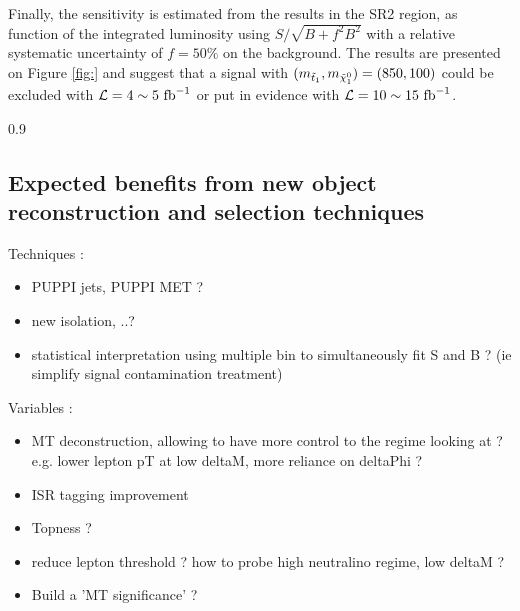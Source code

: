         \begin{table}
            \centering
             
            \caption{ \label{tab:phys14SignalRegions}}
        \end{table}

       Finally, the sensitivity is estimated from the results in the SR2 region, as function 
       of the integrated luminosity using $S / \sqrt{B + f^2 B^2}$ with a relative systematic 
       uncertainty of $f = 50\%$ on the background. The results are presented on Figure 
       \ref{fig:} and suggest that a signal with $(m_{\tilde{t}_1}, m_{\tilde{\chi}_1^0}) = (850,100)$ 
       could be excluded with $\mathcal{L} = 4\sim5~\text{fb}^{-1}$ or put in evidence with 
       $\mathcal{L} = 10\sim15~\text{fb}^{-1}$.

                         {0.9}
                         {}

         \subsection{Expected benefits from new object reconstruction and selection techniques}

            Techniques :
            \begin{itemize}
                \item PUPPI jets, PUPPI MET ?
                \item new isolation, ..?
                \item statistical interpretation using multiple bin to simultaneously fit S and B ? (ie simplify signal contamination treatment)
            \end{itemize}
    
            Variables :
            \begin{itemize}
                \item MT deconstruction, allowing to have more control to the regime looking at ? e.g. lower lepton pT  at low deltaM, more reliance on deltaPhi ?
                \item ISR tagging improvement
                \item Topness ?
                \item reduce lepton threshold ? how to probe high neutralino regime, low deltaM ?
                \item Build a 'MT significance' ?
            \end{itemize}
    
